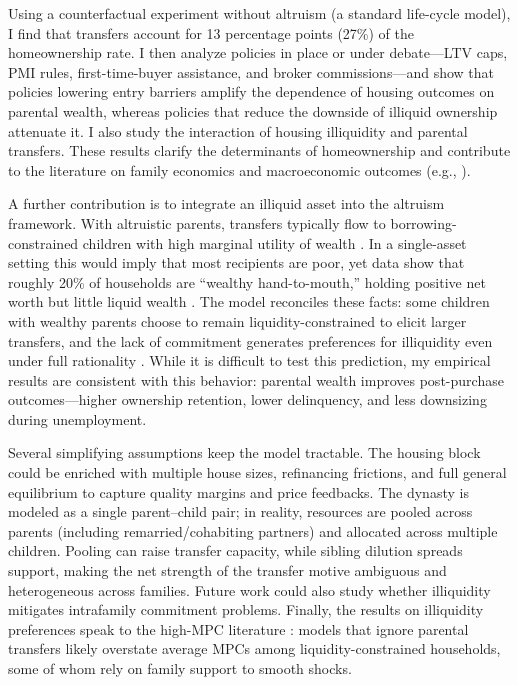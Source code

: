 \documentclass[12pt]{article}
\begin{document}
Using a counterfactual experiment without altruism (a standard life-cycle model), I find that transfers account for 13 percentage points (27\%) of the homeownership rate. I then analyze policies in place or under debate---LTV caps, PMI rules, first-time-buyer assistance, and broker commissions---and show that policies lowering entry barriers amplify the dependence of housing outcomes on parental wealth, whereas policies that reduce the downside of illiquid ownership attenuate it. I also study the interaction of housing illiquidity and parental transfers. These results clarify the determinants of homeownership and contribute to the literature on family economics and macroeconomic outcomes (e.g., \cite{Doepke2016a,Daruich2018}).

A further contribution is to integrate an illiquid asset into the altruism framework. With altruistic parents, transfers typically flow to borrowing-constrained children with high marginal utility of wealth \citep{Barczyk2020,Chu2020}. In a single-asset setting this would imply that most recipients are poor, yet data show that roughly 20\% of households are “wealthy hand-to-mouth,” holding positive net worth but little liquid wealth \citep{Kaplan2014a,Attanasio2018}. The model reconciles these facts: some children with wealthy parents choose to remain liquidity-constrained to elicit larger transfers, and the lack of commitment generates preferences for illiquidity even under full rationality \citep[cf.][]{attanasio2024temptation}.  While it is difficult to test this prediction, my empirical results are consistent with this behavior: parental wealth improves post-purchase outcomes---higher ownership retention, lower delinquency, and less downsizing during unemployment.

Several simplifying assumptions keep the model tractable. The housing block could be enriched with multiple house sizes, refinancing frictions, and full general equilibrium to capture quality margins and price feedbacks. The dynasty is modeled as a single parent–child pair; in reality, resources are pooled across parents (including remarried/cohabiting partners) and allocated across multiple children. Pooling can raise transfer capacity, while sibling dilution spreads support, making the net strength of the transfer motive ambiguous and heterogeneous across families. Future work could also study whether illiquidity mitigates intrafamily commitment problems. Finally, the results on illiquidity preferences speak to the high-MPC literature \citep[e.g.,][]{kaplan2022marginal}: models that ignore parental transfers likely overstate average MPCs among liquidity-constrained households, some of whom rely on family support to smooth shocks.
\end{document}
